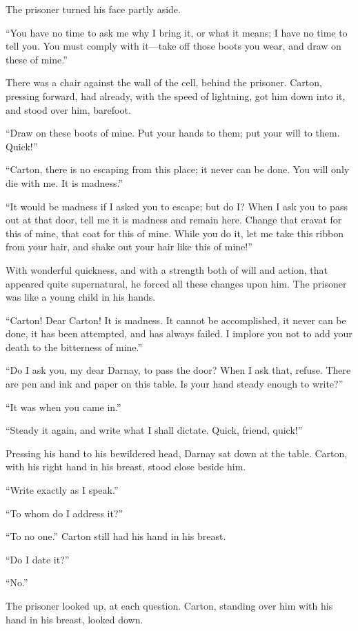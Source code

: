 The prisoner turned his face partly aside.

``You have no time to ask me why I bring it, or what it means; I have
no time to tell you.  You must comply with it---take off those boots
you wear, and draw on these of mine.''

There was a chair against the wall of the cell, behind the
prisoner. Carton, pressing forward, had already, with the speed of
lightning, got him down into it, and stood over him, barefoot.

``Draw on these boots of mine.  Put your hands to them;
put your will to them.  Quick!''

``Carton, there is no escaping from this place; it never can be done.
You will only die with me.  It is madness.''

``It would be madness if I asked you to escape; but do I?  When I ask
you to pass out at that door, tell me it is madness and remain here.
Change that cravat for this of mine, that coat for this of mine.
While you do it, let me take this ribbon from your hair, and shake
out your hair like this of mine!''

With wonderful quickness, and with a strength both of will and action,
that appeared quite supernatural, he forced all these changes upon him.
The prisoner was like a young child in his hands.

``Carton!  Dear Carton!  It is madness.  It cannot be accomplished,
it never can be done, it has been attempted, and has always failed.
I implore you not to add your death to the bitterness of mine.''

``Do I ask you, my dear Darnay, to pass the door?  When I ask that,
refuse.  There are pen and ink and paper on this table.  Is your hand
steady enough to write?''

``It was when you came in.''

``Steady it again, and write what I shall dictate.  Quick, friend, quick!''

Pressing his hand to his bewildered head, Darnay sat down at the table.
Carton, with his right hand in his breast, stood close beside him.

``Write exactly as I speak.''

``To whom do I address it?''

``To no one.''  Carton still had his hand in his breast.

``Do I date it?''

``No.''

The prisoner looked up, at each question.  Carton, standing over him
with his hand in his breast, looked down.

